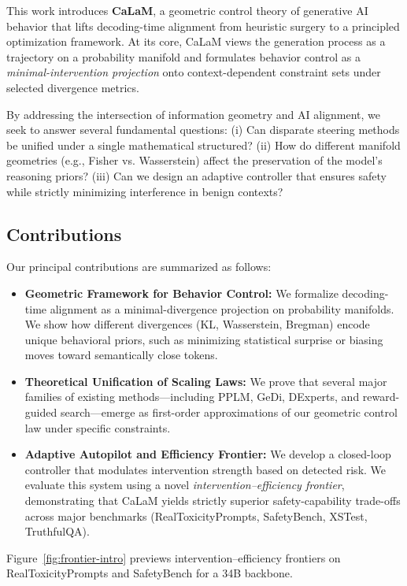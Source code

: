 \documentclass{article}
\theoremstyle{plain}
\theoremstyle{definition}
\theoremstyle{remark}
\begin{document}
This work introduces \textbf{CaLaM}, a geometric control theory of generative AI behavior that lifts decoding-time alignment from heuristic surgery to a principled optimization framework. At its core, CaLaM views the generation process as a trajectory on a probability manifold and formulates behavior control as a \emph{minimal-intervention projection} onto context-dependent constraint sets under selected divergence metrics. 

By addressing the intersection of information geometry and AI alignment, we seek to answer several fundamental questions: (i) Can disparate steering methods be unified under a single mathematical structured? (ii) How do different manifold geometries (e.g., Fisher vs. Wasserstein) affect the preservation of the model's reasoning priors? (iii) Can we design an adaptive controller that ensures safety while strictly minimizing interference in benign contexts?

\subsection*{Contributions}
Our principal contributions are summarized as follows:

\begin{itemize}[leftmargin=1.5em, itemsep=0pt]
  \item \textbf{Geometric Framework for Behavior Control:} We formalize decoding-time alignment as a minimal-divergence projection on probability manifolds. We show how different divergences (KL, Wasserstein, Bregman) encode unique behavioral priors, such as minimizing statistical surprise or biasing moves toward semantically close tokens.
  \item \textbf{Theoretical Unification of Scaling Laws:} We prove that several major families of existing methods---including PPLM, GeDi, DExperts, and reward-guided search---emerge as first-order approximations of our geometric control law under specific constraints.
  \item \textbf{Adaptive Autopilot and Efficiency Frontier:} We develop a closed-loop controller that modulates intervention strength based on detected risk. We evaluate this system using a novel \textit{intervention--efficiency frontier}, demonstrating that CaLaM yields strictly superior safety-capability trade-offs across major benchmarks (RealToxicityPrompts, SafetyBench, XSTest, TruthfulQA).
\end{itemize}

Figure~\ref{fig:frontier-intro} previews intervention--efficiency frontiers on RealToxicityPrompts and SafetyBench for a 34B backbone.
\end{document}
